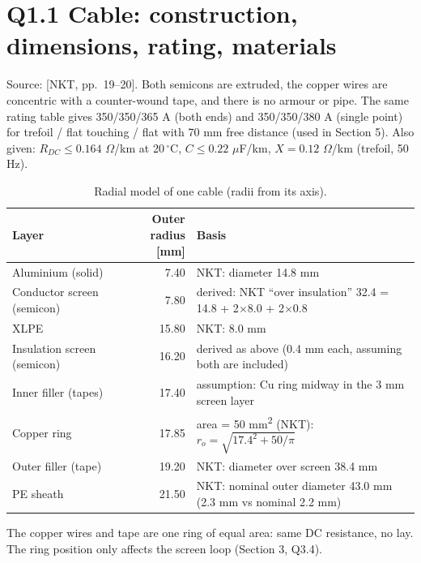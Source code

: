 \def\ReportNumber{1}
\def\ReportName{Cable selection and model setup}

\graphicspath{{../../Slides/figures/}}


\section*{Q1.1 Cable: construction, dimensions, rating, materials}
\assignmentquestion{\QuestionOneOne}
\answer{\AnsOneOne}
Source: [NKT, pp.~19--20]. Both semicons are extruded, the copper wires are concentric with a
counter-wound tape, and there is no armour or pipe. The same rating table gives 350/350/365 A (both
ends) and 350/350/380 A (single point) for trefoil / flat touching / flat with 70 mm free distance
(used in Section 5). Also given: \(R_{DC}\le0.164\) \(\Omega\)/km at 20\,\(^\circ\)C, \(C\le0.22\)
\(\mu\)F/km, \(X=0.12\) \(\Omega\)/km (trefoil, 50 Hz).

\begin{table}[H]\centering\small
\caption{Radial model of one cable (radii from its axis).}
\begin{tabularx}{\linewidth}{@{}Y r Y@{}}
\toprule Layer & Outer radius [mm] & Basis\\\midrule
Aluminium (solid) & 7.40 & NKT: diameter 14.8 mm\\
Conductor screen (semicon) & 7.80 & derived: NKT ``over insulation'' 32.4 = 14.8 + 2\(\times\)8.0 + 2\(\times\)0.8\\
XLPE & 15.80 & NKT: 8.0 mm\\
Insulation screen (semicon) & 16.20 & derived as above (0.4 mm each, assuming both are included)\\
Inner filler (tapes) & 17.40 & assumption: Cu ring midway in the 3 mm screen layer\\
Copper ring & 17.85 & area = 50 mm\textsuperscript2 (NKT): \(r_o=\sqrt{17.4^2+50/\pi}\)\\
Outer filler (tape) & 19.20 & NKT: diameter over screen 38.4 mm\\
PE sheath & 21.50 & NKT: nominal outer diameter 43.0 mm (2.3 mm vs nominal 2.2 mm)\\
\bottomrule
\end{tabularx}
\end{table}
\begin{center}
\end{center}
The copper wires and tape are one ring of equal area: same DC resistance, no lay. The ring
position only affects the screen loop (Section 3, Q3.4).

